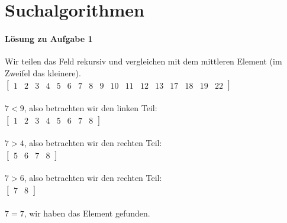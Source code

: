 \documentclass[11pt,a4paper]{scrartcl}
\begin{document}
\section{Suchalgorithmen}
\paragraph{Lösung zu Aufgabe 1}
\label{a2.1:lsg}
Wir teilen das Feld rekursiv und vergleichen mit dem mittleren Element (im Zweifel das kleinere). \\
$\left[ \begin{array}{rrrrrrrrrrrrrrrrr}
1 & 2 & 3 & 4 & 5 & 6 & 7 & 8 & 9 & 10 & 11 & 12 & 13 & 17 & 18 & 19 & 22
\end{array} \right]$ \\\\
$ 7 < 9$, also betrachten wir den linken Teil: \\
$\left[ \begin{array}{rrrrrrrr}
1 & 2 & 3 & 4 & 5 & 6 & 7 & 8
\end{array} \right]$ \\\\
$ 7 > 4$, also betrachten wir den rechten Teil: \\
$\left[ \begin{array}{rrrr}
5 & 6 & 7 & 8
\end{array} \right]$ \\\\
$7 > 6$, also betrachten wir den rechten Teil: \\
$\left[ \begin{array}{rr}
7 & 8
\end{array} \right]$ \\\\
$7 = 7$, wir haben das Element gefunden.
\end{document}
